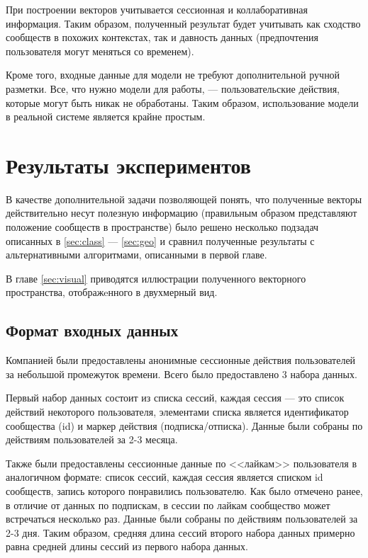 \documentclass[times,specification,annotation]{itmo-student-thesis}
\begin{document}
При построении векторов учитывается сессионная и
коллаборативная информация. Таким образом, полученный результат будет
учитывать как сходство сообществ в похожих контекстах, так и давность данных
(предпочтения пользователя могут меняться со временем). 

Кроме того, входные данные для модели не требуют дополнительной ручной разметки. Все, что нужно модели для работы, --- пользовательские действия, которые могут быть никак не обработаны. Таким образом, использование модели в реальной системе является крайне простым.

\chapter{Результаты экспериментов}

В качестве дополнительной задачи позволяющей понять, что полученные
векторы действительно несут полезную информацию (правильным образом
представляют положение сообществ в пространстве) было решено несколько подзадач
описанных в \ref{sec:class} --- \ref{sec:geo} и сравнил полученные результаты с альтернативными
алгоритмами, описанными в первой главе. 

В главе \ref{sec:visual} приводятся иллюстрации полученного векторного пространства, отображeнного в двухмерный вид.

\section{Формат входных данных}\label{sec:data-format}

Компанией были предоставлены анонимные сессионные действия пользователей за небольшой промежуток времени. Всего было предоставлено 3 набора данных.

Первый набор данных состоит из списка сессий, каждая сессия --- это список действий некоторого пользователя, элементами списка является идентификатор сообщества (id) и маркер действия (подписка/отписка). Данные были собраны по действиям пользователей за 2-3 месяца.

Также были предоставлены сессионные данные по <<лайкам>> пользователя в аналогичном формате: список сессий, каждая сессия является списком id сообществ, запись которого понравились пользователю. Как было отмечено ранее, в отличие от данных по подпискам, в сессии по лайкам сообщество может встречаться несколько раз. Данные были собраны по действиям пользователей за 2-3 дня. Таким образом, средняя длина сессий второго набора данных примерно равна средней длины сессий из первого набора данных. 
\end{document}
